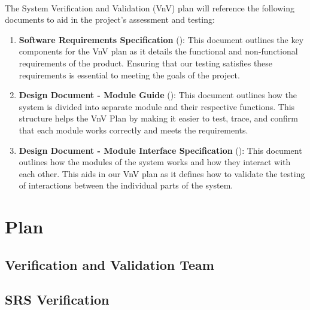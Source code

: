 \documentclass[12pt, titlepage]{article}
\begin{document}
\\
The System Verification and Validation (VnV) plan will reference the following documents to aid in 
the project's assessment and testing:
\begin{enumerate}
  \item \textbf{Software Requirements Specification} (\citet{SRS}): This document outlines the key components 
for the VnV plan as it details the functional and non-functional requirements of the product. Ensuring that our testing 
satisfies these requirements is essential to meeting the goals of the project.
  \item \textbf{Design Document - Module Guide} (\citet{MG}): This document outlines how the system is divided into separate module and their respective functions. 
  This structure helps the VnV Plan by making it easier to test, trace, and confirm that each module works correctly and meets the requirements.
  \item \textbf{Design Document - Module Interface Specification} (\citet{MIS}): This document outlines how the modules of the system works and how they interact with each other.
  This aids in our VnV plan as it defines how to validate the testing of interactions between the individual parts of the system.
\end{enumerate}

\section{Plan}


\subsection{Verification and Validation Team}


\subsection{SRS Verification}

\end{document}
